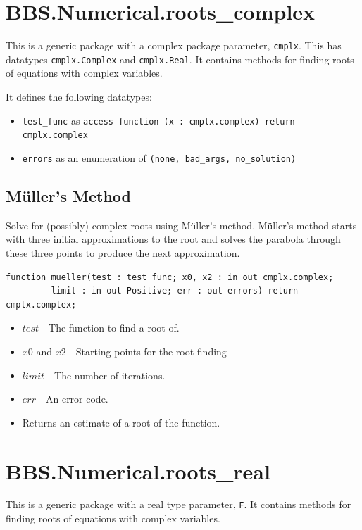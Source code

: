 \documentclass[10pt, openany]{book}
\newcommand{\indexfunc}[1]{\index[func]{#1}}
\newcommand{\datatype}[1]{\texttt{#1}}
\begin{document}
\section{BBS.Numerical.roots\_complex}
This is a generic package with a complex package parameter, \datatype{cmplx}.  This has datatypes \datatype{cmplx.Complex} and \datatype{cmplx.Real}.  It contains methods for finding roots of equations with complex variables.

It defines the following datatypes:
\begin{itemize}
   \item \datatype{test\_func} as \datatype{access function (x : cmplx.complex) return cmplx.complex}
   \item \datatype{errors} as an enumeration of \datatype{(none, bad\_args, no\_solution)}
\end{itemize}

\subsection{M\"uller's Method}
Solve for (possibly) complex roots using M\"uller's method.  M\"uller's method starts with three initial approximations to the root and solves the parabola through these three points to produce the next approximation.
\begin{lstlisting}
function mueller(test : test_func; x0, x2 : in out cmplx.complex;
         limit : in out Positive; err : out errors) return cmplx.complex;
\end{lstlisting}
\indexfunc{root-complex-mueller}
\begin{itemize}
  \item $test$ - The function to find a root of.
  \item $x0$ and $x2$ - Starting points for the root finding
  \item $limit$ - The number of iterations.
  \item $err$ - An error code.
  \item Returns an estimate of a root of the function.
\end{itemize}

\section{BBS.Numerical.roots\_real}
This is a generic package with a real type parameter, \datatype{F}.  It contains methods for finding roots of equations with complex variables.
\end{document}
